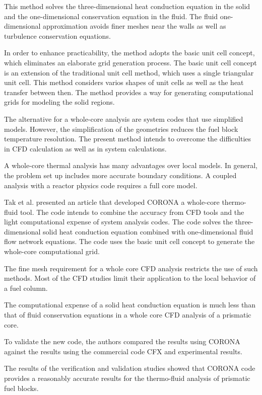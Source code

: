 \documentclass[11pt,letterpaper]{article}
\begin{document}
This method solves the three-dimensional heat conduction equation in the solid and the one-dimensional conservation equation in the fluid.
The fluid one-dimensional approximation avoids finer meshes near the walls as well as turbulence conservation equations.

In order to enhance practicability, the method adopts the basic unit cell concept, which eliminates an elaborate grid generation process.
The basic unit cell concept is an extension of the traditional unit cell method, which uses a single triangular unit cell.
This method considers varios shapes of unit cells as well as the heat transfer between then.
The method provides a way for generating computational grids for modeling the solid regions.

The alternative for a whole-core analysis are system codes that use simplified models.
However, the simplification of the geometries reduces the fuel block temperature resolution.
The present method intends to overcome the difficulties in CFD calculation as well as in system calculations.

A whole-core thermal analysis has many advantages over local models.
In general, the problem set up includes more accurate boundary conditions.
A coupled analysis with a reactor physics code requires a full core model.


Tak et al. \cite{tak_development_2014} presented an article that developed CORONA a whole-core thermo-fluid tool.
The code intends to combine the accuracy from CFD tools and the light computational expense of system analysis codes.
The code solves the three-dimensional solid heat conduction equation combined with one-dimensional fluid flow network equations.
The code uses the basic unit cell concept to generate the whole-core computational grid.

The fine mesh requirement for a whole core CFD analysis restricts the use of such methods.
Most of the CFD studies limit their application to the local behavior of a fuel column.

The computational expense of a solid heat conduction equation is much less than that of fluid conservation equations in a whole core CFD analysis of a prismatic core.

To validate the new code, the authors compared the results using CORONA against the results using the commercial code CFX and experimental results.

The results of the verification and validation studies showed that CORONA code provides a reasonably accurate results for the thermo-fluid analysis of prismatic fuel blocks.
\end{document}
